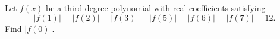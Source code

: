 Let $f(x)$ be a third-degree polynomial with real coefficients satisfying
\[|f(1)|=|f(2)|=|f(3)|=|f(5)|=|f(6)|=|f(7)|=12.\] Find $|f(0)|$.